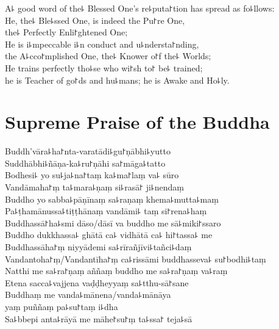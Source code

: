 \begin{leader}
\end{leader}

A꜕ good word of the꜕ Blessed One's re꜕puta꜓tion has spread as fo꜕llows:\\
He, the꜕ Ble꜕ssed One, is indeed the Pu꜓re One,\\
\vin the꜕ Perfectly Enli꜓ghtened One;\\
He is i꜕mpeccable i꜕n conduct and u꜕ndersta꜓nding,\\
\vin the A꜕cco꜓mplished One, the꜕ Knower o꜓f the꜕ Worlds;\\
He trains perfectly tho꜕se who wi꜓sh to꜓ be꜕ trained;\\
\vin he is Teacher of go꜓ds and hu꜕mans; he is Awake and Ho꜕ly.

\clearpage

\chapter{Supreme Praise of the Buddha}%

\begin{leader}
\end{leader}

Buddh'vāra꜕ha꜓nta-varatādi꜕gu꜓ṇābhi꜕yutto\\
Suddhābhi꜕ñāṇa-ka꜕ru꜓ṇāhi sa꜓māga꜕tatto\\
Bodhesi꜕ yo su꜕ja꜕na꜓taṃ ka꜕ma꜓laṃ va꜕ sūro\\
Vandāmaha꜓ṃ ta꜕mara꜕ṇaṃ si꜕rasā꜓ ji꜕nendaṃ\\
Buddho yo sabba꜕pāṇīnaṃ sa꜕raṇaṃ khema꜕mutta꜕maṃ\\
Pa꜕ṭhamānussa꜕tiṭṭhānaṃ vandāmi꜕ taṃ si꜓rena꜕haṃ\\
Buddhassā꜓ha꜕smi dāso/dāsī va buddho me sā꜕miki꜓ssaro\\
Buddho dukkhassa꜕ ghātā ca꜕ vidhātā ca꜕ hi꜓tassa꜕ me\\
Buddhassāha꜓ṃ niyyādemi sa꜕rīrañjīvi꜕tañci꜕daṃ\\
Vandantoha꜓ṃ/Vandantīha꜓ṃ ca꜕rissāmi buddhasseva꜕ su꜓bodhi꜕taṃ\\
Natthi me sa꜕ra꜓ṇaṃ aññaṃ buddho me sa꜕ra꜓ṇaṃ va꜕raṃ\\
Etena sacca꜕vajjena vaḍḍheyyaṃ sa꜕tthu-sā꜓sane\\
Buddhaṃ me vanda꜕mānena/vanda꜕mānāya\\
\vin yaṃ puññaṃ pa꜕su꜓taṃ i꜕dha\\
Sa꜕bbepi anta꜕rāyā me māhe꜓su꜓ṃ ta꜕ssa꜓ teja꜕sā

